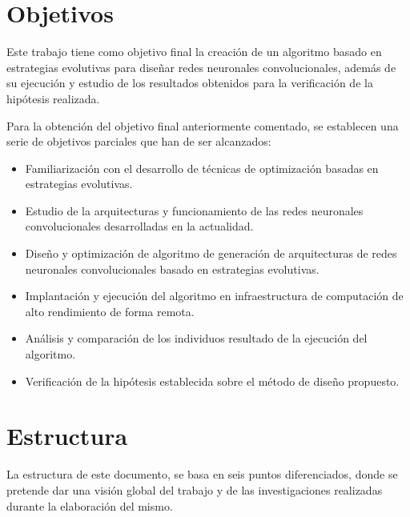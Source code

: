 \section{Objetivos}

Este trabajo tiene como objetivo final la creación de un algoritmo basado en estrategias evolutivas para diseñar redes neuronales convolucionales, además de su ejecución y estudio de los resultados obtenidos para la verificación de la hipótesis realizada.

Para la obtención del objetivo final anteriormente comentado, se establecen una serie de objetivos parciales que han de ser alcanzados:

\begin{itemize}

    \item Familiarización con el desarrollo de técnicas de optimización basadas en estrategias evolutivas.
    
    \item Estudio de la arquitecturas y funcionamiento de las redes neuronales convolucionales desarrolladas en la actualidad.
    
    \item Diseño y optimización de algoritmo de generación de arquitecturas de redes neuronales convolucionales basado en estrategias evolutivas.
    
    \item Implantación y ejecución del algoritmo en infraestructura de computación de alto rendimiento de forma remota.
    
    \item Análisis y comparación de los individuos resultado de la ejecución del algoritmo.
    
    \item Verificación de la hipótesis establecida sobre el método de diseño propuesto.
    
\end{itemize}

\section{Estructura}

La estructura de este documento, se basa en seis puntos diferenciados, donde se pretende dar una visión global del trabajo y de las investigaciones realizadas durante la elaboración del mismo.

